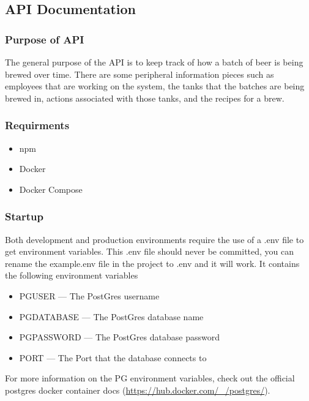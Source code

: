 
\subsection{API Documentation}

\subsubsection{Purpose of API}
The general purpose of the API is to keep track of how a batch of beer is being brewed over time. There are some peripheral information pieces such as employees that are working on the system, the tanks that the batches are being brewed in, actions associated with those tanks, and the recipes for a brew.

\subsubsection{Requirments}
\begin{itemize}
    \item npm
    \item Docker
    \item Docker Compose
\end{itemize}

\subsubsection{Startup}
Both development and production environments require the use of a .env file to get environment variables. This .env file should never be committed, you can rename the example.env file in the project to .env and it will work. It contains the following environment variables

\begin{itemize}
    \item PGUSER --- The PostGres username
    \item PGDATABASE --- The PostGres database name
    \item PGPASSWORD --- The PostGres database password
    \item PORT --- The Port that the database connects to
\end{itemize}

\noindent
For more information on the PG environment variables, check out the official postgres docker container docs (\href{https://hub.docker.com/_/postgres/}{https://hub.docker.com/_/postgres/}).

